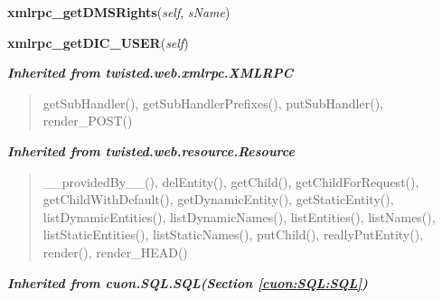     \label{cuon:Database:Database:xmlrpc_getDMSRights}

    \vspace{0.5ex}

\hspace{.8\funcindent}\begin{boxedminipage}{\funcwidth}

    \raggedright \textbf{xmlrpc\_getDMSRights}(\textit{self}, \textit{sName})

\setlength{\parskip}{2ex}
\setlength{\parskip}{1ex}
    \end{boxedminipage}

    \label{cuon:Database:Database:xmlrpc_getDIC_USER}

    \vspace{0.5ex}

\hspace{.8\funcindent}\begin{boxedminipage}{\funcwidth}

    \raggedright \textbf{xmlrpc\_getDIC\_USER}(\textit{self})

\setlength{\parskip}{2ex}
\setlength{\parskip}{1ex}
    \end{boxedminipage}


\large{\textbf{\textit{Inherited from twisted.web.xmlrpc.XMLRPC}}}

\begin{quote}
getSubHandler(), getSubHandlerPrefixes(), putSubHandler(), render\_POST()
\end{quote}

\large{\textbf{\textit{Inherited from twisted.web.resource.Resource}}}

\begin{quote}
\_\_providedBy\_\_(), delEntity(), getChild(), getChildForRequest(), getChildWithDefault(), getDynamicEntity(), getStaticEntity(), listDynamicEntities(), listDynamicNames(), listEntities(), listNames(), listStaticEntities(), listStaticNames(), putChild(), reallyPutEntity(), render(), render\_HEAD()
\end{quote}

\large{\textbf{\textit{Inherited from cuon.SQL.SQL\textit{(Section \ref{cuon:SQL:SQL})}}}}

